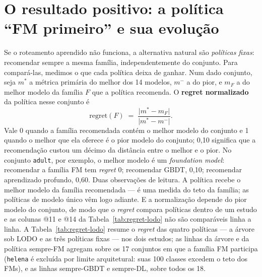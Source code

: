 \section{O resultado positivo: a política ``FM primeiro'' e sua
evolução}
\label{sec:resultado-positivo}

Se o roteamento aprendido não funciona, a alternativa natural são
\emph{políticas fixas}: recomendar sempre a mesma família,
independentemente do conjunto. Para compará-las, medimos o que cada
política deixa de ganhar. Num dado conjunto, seja $m^{*}$ a métrica
primária do melhor dos 14 modelos, $m^{-}$ a do pior, e $m_{F}$ a do
melhor modelo da família $F$ que a política recomenda. O
\textbf{regret normalizado} da política nesse conjunto é
\begin{equation}
\mathrm{regret}(F) \;=\;
\frac{\lvert m^{*} - m_{F} \rvert}{\lvert m^{*} - m^{-} \rvert}.
\label{eq:regret-normalizado}
\end{equation}
Vale 0 quando a família recomendada contém o melhor modelo do conjunto
e 1 quando o melhor que ela oferece é o pior modelo do conjunto; 0,10
significa que a recomendação custou um décimo da distância entre o
melhor e o pior. No conjunto \texttt{adult}, por exemplo, o melhor
modelo é um \emph{foundation model}: recomendar a família FM tem
\emph{regret} 0; recomendar GBDT, 0,10; recomendar aprendizado
profundo, 0,60. Duas observações de leitura. A política recebe o
melhor modelo da família recomendada --- é uma medida do teto da
família; as políticas de modelo único vêm logo adiante. E a
normalização depende do pior modelo do conjunto, de modo que o
\emph{regret} compara políticas dentro de um estudo e as colunas @11
e @14 da Tabela~\ref{tab:regret-lodo} não são comparáveis linha a
linha. A Tabela~\ref{tab:regret-lodo} resume o \emph{regret} das quatro políticas ---
a árvore sob LODO e as três políticas fixas --- nos dois estudos; as
linhas da árvore e da política sempre-FM agregam sobre os 17 conjuntos em
que a família FM participa (\texttt{helena} é excluída por limite
arquitetural: suas 100 classes excedem o teto dos FMs), e as linhas
sempre-GBDT e sempre-DL, sobre
todos os 18.

